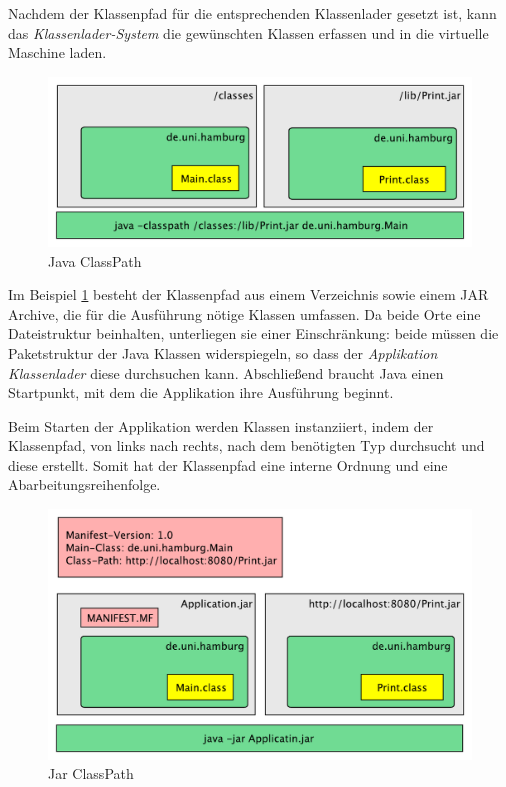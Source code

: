   Nachdem der Klassenpfad für die entsprechenden Klassenlader gesetzt ist, kann das \textit{Klassenlader-System} die gewünschten Klassen erfassen und in die virtuelle Maschine laden.

  \begin{figure}[h]
    \includegraphics[width=\textwidth]{material/images/Classpath2.pdf}
    \caption{Java ClassPath}
    \label{fig:cps}
  \end{figure}

  Im Beispiel \ref{fig:cps} besteht der Klassenpfad aus einem Verzeichnis sowie einem JAR Archive, die für die Ausführung nötige Klassen umfassen. Da beide Orte eine Dateistruktur beinhalten, unterliegen sie einer Einschränkung: beide müssen die Paketstruktur der Java Klassen widerspiegeln, so dass der \textit{Applikation Klassenlader} diese durchsuchen kann. Abschließend braucht Java einen Startpunkt, mit dem die Applikation ihre Ausführung beginnt. 

  Beim Starten der Applikation werden Klassen instanziiert, indem der Klassenpfad, von links nach rechts, nach dem benötigten Typ durchsucht und diese erstellt. Somit hat der Klassenpfad eine interne Ordnung und eine Abarbeitungsreihenfolge. 

  \begin{figure}[h]
    \includegraphics[width=\textwidth]{material/images/Classpath-Manifest2.pdf}
    \caption{Jar ClassPath}
    \label{fig:cpa}
  \end{figure}

